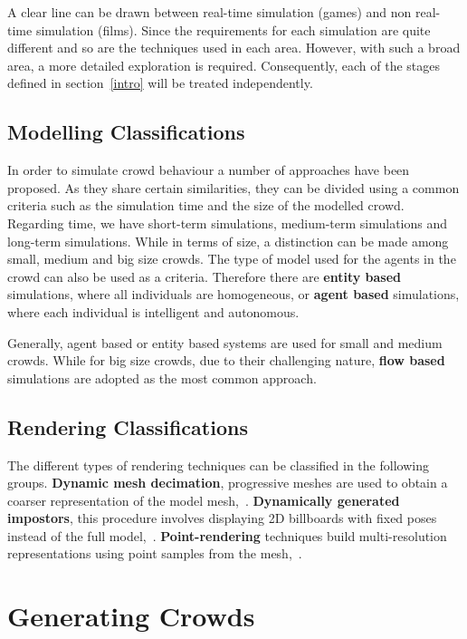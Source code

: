 \documentclass[6pt]{article}
\begin{document}
\begin{multicols}{2}
A clear line can be drawn between real-time simulation (games) and non real-time simulation (films).
Since the requirements for each simulation are quite different and so are the techniques used in each area.
However, with such a broad area, a more detailed exploration is required.
Consequently, each of the stages defined in section~\ref{intro} will be treated independently.

\subsection{Modelling Classifications}
\label{subsec:ModelClassification}

In order to simulate crowd behaviour a number of approaches have been proposed.
As they share certain similarities, they can be divided using a common criteria such as the simulation time  and the size of the modelled crowd.
Regarding time, we have short-term simulations, medium-term simulations and long-term simulations.
While in terms of size, a distinction can be made among small, medium and big size crowds.
The type of model used for the agents in the crowd can also be used as a criteria.
Therefore there are \textbf{entity based} simulations, where all individuals are homogeneous, or \textbf{agent based} simulations, where each individual is intelligent and autonomous.

Generally, agent based or entity based systems are used for small and medium crowds.
While for big size crowds, due to their challenging nature, \textbf{flow based} simulations are adopted as the most common approach.

\subsection{Rendering Classifications}
\label{subsec:RenderingClassification}

The different types of rendering techniques can be classified in the following groups.
\textbf{Dynamic mesh decimation}, progressive meshes are used to obtain a coarser representation of the model mesh,~\cite{Hoppe1996}.
\textbf{Dynamically generated impostors}, this procedure involves displaying 2D billboards with fixed poses instead of the full model,~\cite{Aubel2000}.
\textbf{Point-rendering} techniques build multi-resolution representations using point samples from the mesh,~\cite{Wand2002}.

\section{Generating Crowds}


\end{multicols}
\end{document}
